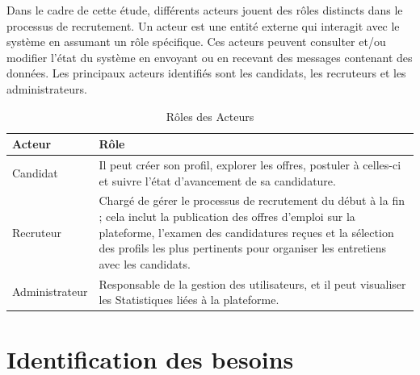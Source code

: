 Dans le cadre de cette étude, différents acteurs jouent des rôles 
distincts dans le processus de recrutement. Un acteur est une entité 
externe qui interagit avec le système en assumant un rôle spécifique. 
Ces acteurs peuvent consulter et/ou modifier l'état du système en 
envoyant ou en recevant des messages contenant des données. Les principaux 
acteurs identifiés sont les candidats, les recruteurs et les 
administrateurs.

\renewcommand{\arraystretch}{1.5}
\begin{table}[htbp]
   \centering
   \caption{Rôles des Acteurs}
   \begin{tabular}{|p{3cm}|p{9cm}|}
       \hline
       \rowcolor{blue!30}
       \textbf{Acteur} & \textbf{Rôle} \\
       \hline
       Candidat & Il peut créer son profil, explorer les offres, postuler à celles-ci et suivre l’état d’avancement de sa candidature. \\
       \hline
       Recruteur & Chargé de gérer le processus de recrutement du début à la fin ; cela inclut la publication des offres d’emploi sur la plateforme, l'examen des candidatures reçues et la sélection des profils les plus pertinents pour organiser les entretiens avec les candidats. \\
       \hline
       Administrateur & Responsable de la gestion des utilisateurs, et il peut visualiser les Statistiques liées à la plateforme. \\
       \hline
   \end{tabular}
\end{table}

\section{Identification des besoins}



